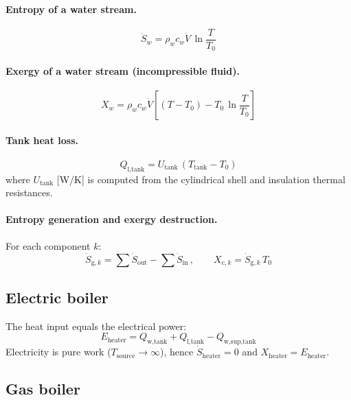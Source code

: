 \paragraph{Entropy of a water stream.}
\begin{equation}\label{eq:dhw-S}
  \dot{S}_w = \rho_w c_w \dot{V}\,\ln\frac{T}{T_0}
\end{equation}

\paragraph{Exergy of a water stream (incompressible fluid).}
\begin{equation}\label{eq:dhw-X}
  X_w = \rho_w c_w \dot{V}\left[(T - T_0) - T_0\,\ln\frac{T}{T_0}\right]
\end{equation}

\paragraph{Tank heat loss.}
\begin{equation}\label{eq:dhw-Ql}
  Q_\text{l,tank} = U_\text{tank}\,(T_\text{tank} - T_0)
\end{equation}
where $U_\text{tank}$ [W/K] is computed from the cylindrical shell and insulation thermal resistances.

\paragraph{Entropy generation and exergy destruction.}
For each component $k$:
\begin{equation}\label{eq:dhw-Sg}
  \dot{S}_{\text{g},k} = \sum \dot{S}_\text{out} - \sum \dot{S}_\text{in}
  \,,\qquad
  X_{\text{c},k} = \dot{S}_{\text{g},k}\,T_0
\end{equation}

\subsection{Electric boiler}

The heat input equals the electrical power:
\begin{equation}\label{eq:eb-energy}
  E_\text{heater} = Q_\text{w,tank} + Q_\text{l,tank} - Q_\text{w,sup,tank}
\end{equation}
Electricity is pure work ($T_\text{source} \to \infty$), hence $\dot{S}_\text{heater} = 0$ and $X_\text{heater} = E_\text{heater}$.

\subsection{Gas boiler}

